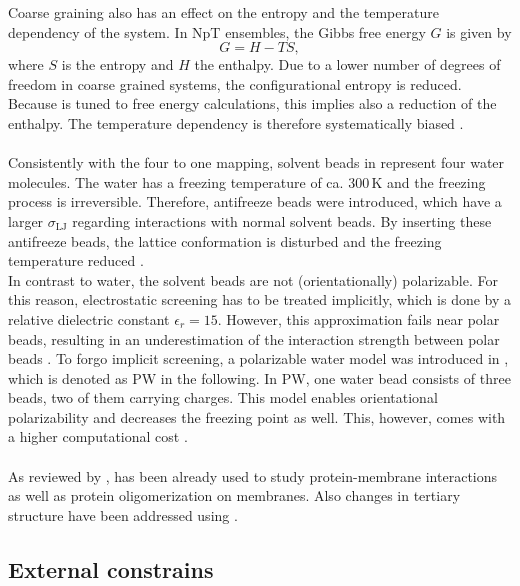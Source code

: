 Coarse graining also has an effect on the entropy and the temperature dependency of the system. In NpT ensembles, the Gibbs free energy $G$ is given by
\begin{equation}
G = H - T S,
\end{equation}
where $S$ is the entropy and $H$ the enthalpy. Due to a lower number of degrees of freedom in coarse grained systems, the configurational entropy is reduced. Because \martini{} is tuned to free energy calculations, this implies also a reduction of the enthalpy. The temperature dependency is therefore systematically biased \autocite{martini22_check}.\\ 
\\
Consistently with the four to one mapping, solvent beads in \martini{} represent four water molecules. The \martini{} water has a freezing temperature of ca. $300\,\si{\kelvin}$ and the freezing process is irreversible. Therefore, antifreeze beads were introduced, which have a larger $\sigma_\text{LJ}$ regarding interactions with normal solvent beads. By inserting these antifreeze beads, the lattice conformation is disturbed and the freezing temperature reduced \autocite{martini}.\\
In contrast to water, the solvent beads are not (orientationally) polarizable. For this reason, electrostatic screening has to be treated implicitly, which is done by a relative dielectric constant $\epsilon_r = 15$. However, this approximation fails near polar beads, resulting in an underestimation of the interaction strength between polar beads \autocite{martini22_check}. To forgo implicit screening, a polarizable water model was introduced in \martini{}, which is denoted as PW in the following. In PW, one water bead consists of three beads, two of them carrying charges. This model enables orientational polarizability and decreases the freezing point as well.
This, however, comes with a higher computational cost \autocite{polarizableMartini}.\\
\\
As reviewed by \textcite{martini22_check}, \martini{} has been already used to study protein-membrane interactions as well as protein oligomerization on membranes. Also changes in tertiary structure have been addressed using \martini{}.
\subsection{External constrains}
